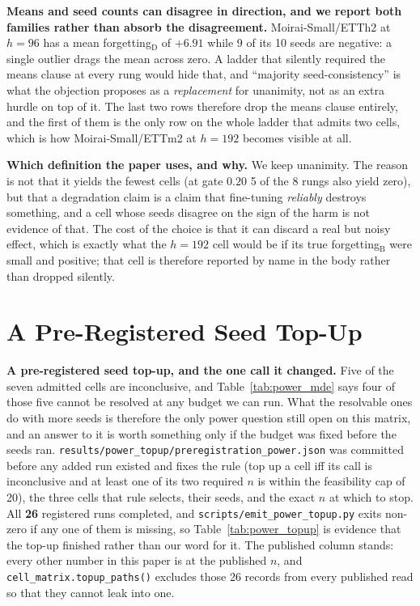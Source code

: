 \textbf{Means and seed counts can disagree in direction, and we report both
families rather than absorb the disagreement.} Moirai-Small/ETTh2 at $h{=}96$ has
a mean forgetting$_\text{D}$ of $+6.91$ while 9 of its 10 seeds are negative: a
single outlier drags the mean across zero. A ladder that silently required the
means clause at every rung would hide that, and ``majority seed-consistency'' is
what the objection proposes as a \emph{replacement} for unanimity, not as an
extra hurdle on top of it. The last two rows therefore drop the means clause
entirely, and the first of them is the only row on the whole ladder that admits
two cells, which is how Moirai-Small/ETTm2 at $h{=}192$ becomes visible at all.

\textbf{Which definition the paper uses, and why.} We keep unanimity. The reason
is not that it yields the fewest cells (at gate $0.20$ 5 of the 8 rungs
also yield zero), but that a degradation claim is a claim that fine-tuning
\emph{reliably} destroys something, and a cell whose seeds disagree on the sign
of the harm is not evidence of that. The cost of the choice is that it can
discard a real but noisy effect, which is exactly what the $h{=}192$ cell would
be if its true forgetting$_\text{B}$ were small and positive; that cell is
therefore reported by name in the body rather than dropped silently.

\clearpage
\section{A Pre-Registered Seed Top-Up}
\label{app:powertopup}

\textbf{A pre-registered seed top-up, and the one call it changed.}  Five of the
seven admitted cells are inconclusive, and Table~\ref{tab:power_mde} says four of
those five cannot be resolved at any budget we can run.  What the resolvable ones do
with more seeds is therefore the only power question still open on this matrix, and
an answer to it is worth something only if the budget was fixed before the seeds
ran.  \texttt{results/power\_topup/preregistration\_power.json} was committed before
any added run existed and fixes the rule (top up a cell iff its call is inconclusive
and at least one of its two required $n$ is within the feasibility cap of 20), the
three cells that rule selects, their seeds, and the exact $n$ at which to stop.  All
\textbf{26} registered runs completed, and \texttt{scripts/emit\_power\_topup.py}
exits non-zero if any one of them is missing, so Table~\ref{tab:power_topup} is
evidence that the top-up finished rather than our word for it.  The published column
stands: every other number in this paper is at the
published $n$, and \texttt{cell\_matrix.topup\_paths()} excludes those 26 records
from every published read so that they cannot leak into one.


